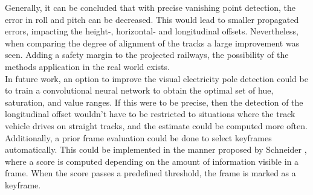 Generally, it can be concluded that with precise vanishing point detection, the error in roll and pitch can be decreased. This would lead to smaller propagated errors, impacting the height-, horizontal- and longitudinal offsets. Nevertheless, when comparing the degree of alignment of the tracks a large improvement was seen. Adding a safety margin to the projected railways, the possibility of the methods application in the real world exists.\\

In future work, an option to improve the visual electricity pole detection could be to train a convolutional neural network to obtain the optimal set of hue, saturation, and value ranges. If this were to be precise, then the detection of the longitudinal offset wouldn't have to be restricted to situations where the track vehicle drives on straight tracks, and the estimate could be computed more often. Additionally, a prior frame evaluation could be done to select keyframes automatically. This could be implemented in the manner proposed by Schneider \citep{schneider2017visual}, where a score is computed depending on the amount of information visible in a frame. When the score passes a predefined threshold, the frame is marked as a keyframe. 
